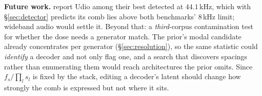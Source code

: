 \documentclass{article}
\begin{document}
\noindent\textbf{Future work.} \cite{afchar2026finding} report Udio among their
best detected at $44.1$\,kHz, which with \S\ref{sec:detector} predicts its comb
lies above both benchmarks' $8$\,kHz limit; wideband audio would settle it. Beyond
that: a \emph{third}-corpus contamination test for whether the dose needs a
generator match. The prior's modal candidate already concentrates per
generator (\S\ref{sec:resolution}), so the same statistic could \emph{identify} a
decoder and not only flag one, and a search that discovers spacings rather than
enumerating them would reach architectures the prior omits. Since $f_s/\prod_l s_l$
is fixed by the stack, editing a decoder's latent should change how strongly the comb
is expressed but not where it sits.%
\label{endofbody}



\end{document}
